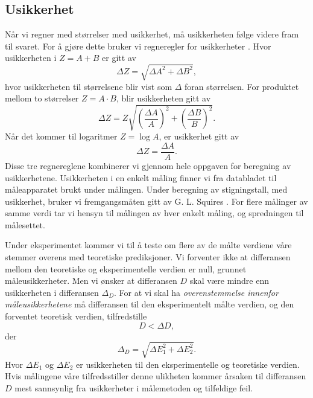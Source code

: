 \documentclass[%
 reprint,
nofootinbib,
aps,
]{revtex4-1}
\begin{document}
\subsection{Usikkerhet}
Når vi regner med størrelser med usikkerhet, må usikkerheten følge videre fram til svaret. For å gjøre dette bruker vi regneregler for usikkerheter \cite{squires}. Hvor usikkerheten i $Z=A+B$ er gitt av
\begin{equation*}
  \Delta Z = \sqrt{\Delta A^2+\Delta B^2},
\end{equation*}
hvor usikkerheten til størrelsene blir vist som $\Delta$ foran størrelsen. For produktet mellom to størrelser $Z=A\cdot B$, blir usikkerheten gitt av
\begin{equation*}
  \Delta Z = Z\sqrt{\left(\frac{\Delta A}{A}\right)^2 + \left(\frac{\Delta B}{B}\right)^2}.
\end{equation*}
Når det kommer til logaritmer $Z=\log{A}$, er usikkerhet gitt av
\begin{equation*}
  \Delta Z = \frac{\Delta A}{A}.
\end{equation*}
Disse tre regnereglene kombinerer vi gjennom hele oppgaven for beregning av usikkerhetene. Usikkerheten i en enkelt måling finner vi fra databladet til måleapparatet brukt under målingen. Under beregning av stigningstall, med usikkerhet, bruker vi fremgangsmåten gitt av G. L. Squires \cite{squires}. For flere målinger av samme verdi tar vi hensyn til målingen av hver enkelt måling, og spredningen til målesettet.
\par
Under eksperimentet kommer vi til å teste om flere av de målte verdiene våre stemmer overens med teoretiske prediksjoner. Vi forventer ikke at differansen mellom den teoretiske og eksperimentelle verdien er null, grunnet måleusikkerheter. Men vi ønsker at differansen $D$ skal være mindre enn usikkerheten i differansen $\Delta_D$. For at vi skal ha \textit{overenstemmelse innenfor måleusikkerhetene} må differansen til den eksperimentelt målte verdien, og den forventet teoretisk verdien, tilfredstille
\begin{equation}
  D < \Delta D, \label{usikk1}
\end{equation}
der
\begin{equation}
  \Delta_D = \sqrt{\Delta E_1^2 + \Delta E_2^2}. \label{usikk2}
\end{equation}
Hvor $\Delta E_1$ og $\Delta E_2$ er usikkerheten til den eksperimentelle og teoretiske verdien.
Hvis målingene våre tilfredsstiller denne ulikheten kommer årsaken til differansen $D$ mest sannsynlig fra usikkerheter i målemetoden og tilfeldige feil.
\end{document}
